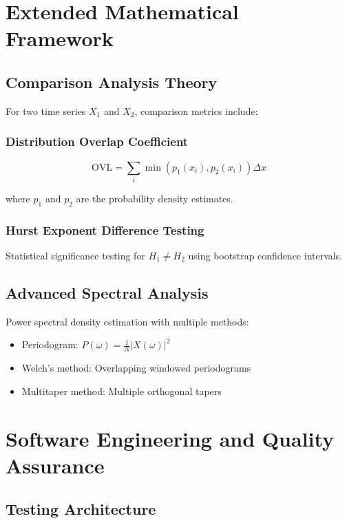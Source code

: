 \documentclass[11pt,a4paper]{article}
\begin{document}
\section{Extended Mathematical Framework}

\subsection{Comparison Analysis Theory}

For two time series $X_1$ and $X_2$, comparison metrics include:

\subsubsection{Distribution Overlap Coefficient}
\begin{equation}
\text{OVL} = \sum_{i} \min(p_1(x_i), p_2(x_i)) \Delta x
\end{equation}

where $p_1$ and $p_2$ are the probability density estimates.

\subsubsection{Hurst Exponent Difference Testing}
Statistical significance testing for $H_1 \neq H_2$ using bootstrap confidence intervals.

\subsection{Advanced Spectral Analysis}

Power spectral density estimation with multiple methods:
\begin{itemize}
    \item Periodogram: $P(\omega) = \frac{1}{N}|X(\omega)|^2$
    \item Welch's method: Overlapping windowed periodograms
    \item Multitaper method: Multiple orthogonal tapers
\end{itemize}

\section{Software Engineering and Quality Assurance}

\subsection{Testing Architecture}
\end{document}
